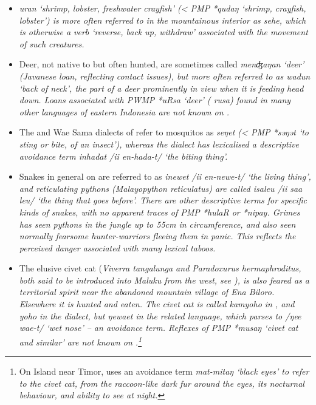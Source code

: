  \begin{itemize}
	\item {} \it{uran} ‘shrimp,
				lobster, freshwater crayfish’ (< PMP *qudaŋ ‘shrimp,
				crayfish, lobster’) is more often referred to in the mountainous
				interior as \it{sehe}, which is otherwise a verb ‘reverse,
				back up, withdraw’ associated with the movement of such creatures.
	\item Deer, not native to  but often hunted,
				are sometimes called \it{menʤaŋan} ‘deer’ (Javanese loan,
				reflecting contact issues), but more often referred to as \it{wadun}
				‘back of neck’, the part of a deer prominently in view when it is feeding head down.
				Loans associated with PWMP *uRsa ‘deer’ ( \it{rusa}) found
				in many other languages of eastern Indonesia are not known on .
	\item The 
				and Wae Sama dialects of  refer to mosquitos as \it{seŋet}
				(< PMP *səŋət ‘to sting or bite,
				of an insect’), whereas the  dialect has lexicalised
				a descriptive avoidance term \it{inhadat} /ii en-hada-t/ ‘the biting thing’.
	\item Snakes in general on  are referred to as \it{inewet}
				/ii en-newe-t/ ‘the living thing’,
				and reticulating pythons (\it{Malayopython reticulatus}) are
				called \it{isaleu} /ii saa leu/ ‘the thing that goes before’.
				There are other descriptive terms for specific kinds of snakes,
				with no apparent traces of PMP *hulaR or *nipay.
				Grimes has seen pythons in the  jungle up to 55cm in circumference,
				and also seen normally fearsome hunter-warriors fleeing them in panic.
				This reflects the perceived danger associated with many lexical taboos.
	\item The elusive civet cat (\it{Viverra tangalunga}
				and \it{Paradoxurus hermaphroditus}, both said to be introduced
				into Maluku from the west,
				see ), is also feared as a territorial spirit near
				the abandoned mountain village of Ena Biloro.
				Elsewhere it is hunted and eaten.
				The civet cat is called \it{kamyoho} in ,
				and \it{yoho} in the  dialect,
				but \it{ŋewaet} in the related  language,
				which parses to /ŋee wae-t/ ‘wet nose’ -- an avoidance term.
				Reflexes of PMP *musaŋ ‘civet cat
				and similar’ are not known on .\footnote{
						On  Island
						near Timor,  uses an avoidance term \it{mat-mitaŋ} ‘black eyes’ to
						refer to the civet cat,
						from the raccoon-like dark fur around the eyes,
						its nocturnal behaviour, and ability to see at night.}
 \end{itemize}

